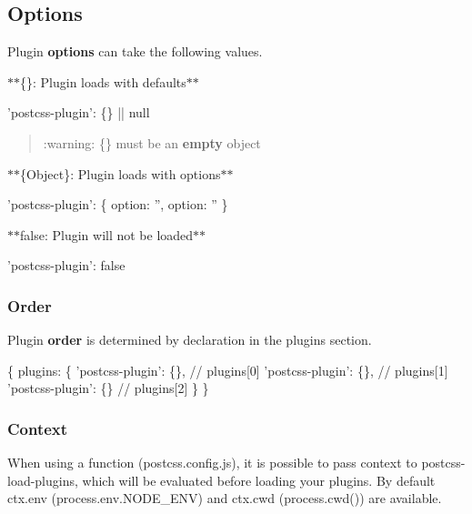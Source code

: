 \subsection*{Options}

Plugin {\bfseries options} can take the following values.

$\ast$$\ast${\ttfamily \{\}}\+: Plugin loads with defaults$\ast$$\ast$


\begin{DoxyCode}
'postcss-plugin': \{\} || null
\end{DoxyCode}


\begin{quote}
\+:warning\+: {\ttfamily \{\}} must be an {\bfseries empty} object \end{quote}


$\ast$$\ast${\ttfamily \{Object\}}\+: Plugin loads with options$\ast$$\ast$


\begin{DoxyCode}
'postcss-plugin': \{ option: '', option: '' \}
\end{DoxyCode}


$\ast$$\ast${\ttfamily false}\+: Plugin will not be loaded$\ast$$\ast$


\begin{DoxyCode}
'postcss-plugin': false
\end{DoxyCode}


\subsubsection*{Order}

Plugin {\bfseries order} is determined by declaration in the plugins section.


\begin{DoxyCode}
\{
  plugins: \{
    'postcss-plugin': \{\}, // plugins[0]
    'postcss-plugin': \{\}, // plugins[1]
    'postcss-plugin': \{\}  // plugins[2]
  \}
\}
\end{DoxyCode}


\subsubsection*{Context}

When using a function {\ttfamily (postcss.\+config.\+js)}, it is possible to pass context to {\ttfamily postcss-\/load-\/plugins}, which will be evaluated before loading your plugins. By default {\ttfamily ctx.\+env (process.\+env.\+N\+O\+D\+E\+\_\+\+E\+NV)} and {\ttfamily ctx.\+cwd (process.\+cwd())} are available.

